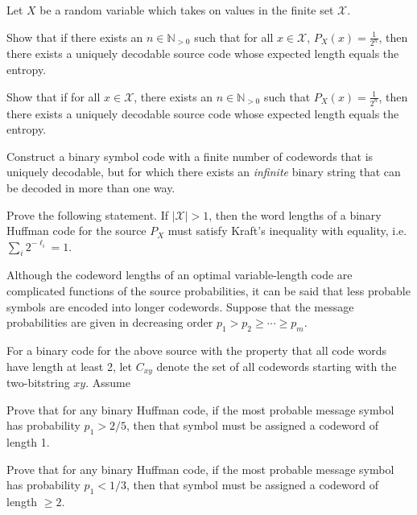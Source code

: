 \documentclass[a4paper,10pt,landscape,twocolumn]{scrartcl}
\begin{document}
\begin{exercise}
Let $X$ be a random variable which takes on values in the finite set $\mathcal{X}$.
	\begin{subex}
	Show that if there exists an $n \in \mathbb{N}_{>0}$ such that for
        all $x \in \mathcal{X}$, $P_X(x) = \frac{1}{2^n}$, then there
        exists a uniquely decodable source code whose expected length equals the entropy.
	\end{subex}
	\begin{subex}
        Show that if for all $x \in \mathcal{X}$, there exists an $n \in \mathbb{N}_{>0}$ such that $P_X(x) = \frac{1}{2^n}$, then there exists a uniquely decodable source code whose expected length equals the entropy.
	\end{subex}
\end{exercise}

\begin{bonusexercise}
Construct a binary symbol code with a finite number of codewords that is uniquely decodable, but for which there exists an \emph{infinite} binary string that can be decoded in more than one way.
\end{bonusexercise}

\begin{exercise}
Prove the following statement. 
If $|\mathcal{X}| >1$, then the word lengths of a binary Huffman code for the source $P_X$ must satisfy Kraft's inequality with equality, i.e. $\sum_i 2^{-\ell_i} = 1$.
\end{exercise}



\begin{bonusexercise}
Although the codeword lengths of an optimal variable-length code are complicated functions of the source probabilities, it can be said that less probable symbols are encoded into longer codewords. Suppose that the message probabilities are given in decreasing order $p_1 > p_2 \geq \cdots \geq p_m$.

\begin{subex}
For a binary code for the above source with the property that all code words have length at least 2, let $C_{xy}$ denote the set of all codewords starting with the two-bitstring $xy$. Assume 
\end{subex}
\begin{subex}
	Prove that for any binary Huffman code, if the most probable message symbol has probability $p_1 > 2/5$, then that symbol must be assigned a codeword of length 1.
	\end{subex}
	\begin{subex}
	Prove that for any binary Huffman code, if the most probable message symbol has probability $p_1 < 1/3$, then that symbol must be assigned a codeword of length $\geq 2$.
	\end{subex}
\end{bonusexercise}
\end{document}
